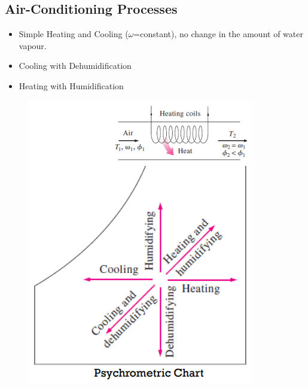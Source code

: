 \documentclass[class=report, crop=false, 12pt,a4paper]{standalone}
\numberwithin{equation}{section}
\begin{document}
\subsection{Air-Conditioning Processes}
\begin{itemize}[noitemsep]
  \item Simple Heating and Cooling ($\omega$=constant), no change in the amount of water vapour.
  \item Cooling with Dehumidification
  \item Heating with Humidification
\end{itemize}
\begin{figure}[H]
  \centering
  \includegraphics[width = 0.55 \textwidth]{../img/diagram108.png}
  \caption{}
\end{figure}
\end{document}
